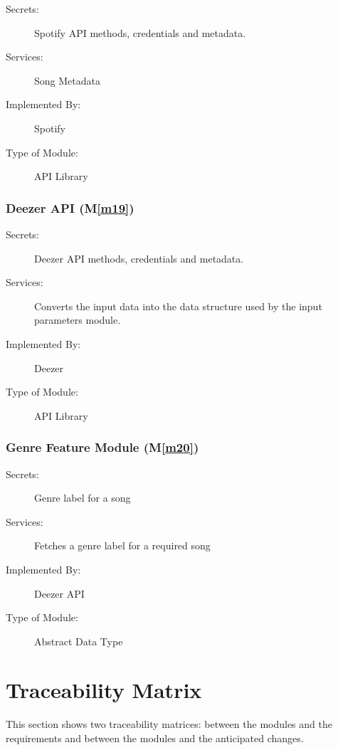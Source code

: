 \documentclass[12pt, titlepage]{article}
\newcommand{\mref}[1]{M\ref{#1}}
\begin{document}
\begin{description}
\item[Secrets:]Spotify API methods, credentials and metadata. 
\item[Services:]Song Metadata
\item[Implemented By:] Spotify
\item[Type of Module:] API Library
\end{description}

\subsubsection{Deezer API (\mref{m19})}

\begin{description}
\item[Secrets:]Deezer API methods, credentials and metadata. 
\item[Services:]Converts the input data into the data structure used by the
  input parameters module.
\item[Implemented By:] Deezer
\item[Type of Module:] API Library
\end{description}

\subsubsection{Genre Feature Module (\mref{m20})}

\begin{description}
\item[Secrets:]Genre label for a song
\item[Services:]Fetches a genre label for a required song
\item[Implemented By:] Deezer API
\item[Type of Module:] Abstract Data Type
\end{description}

\section{Traceability Matrix} \label{SecTM}

This section shows two traceability matrices: between the modules and the
requirements and between the modules and the anticipated changes.
\end{document}
